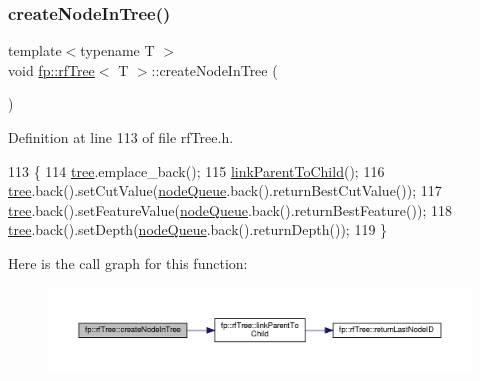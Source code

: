 \subsubsection{\texorpdfstring{create\+Node\+In\+Tree()}{createNodeInTree()}\hspace{0.1cm}{\footnotesize\ttfamily [1/2]}}
{\footnotesize\ttfamily template$<$typename T $>$ \\
void \hyperlink{classfp_1_1rfTree}{fp\+::rf\+Tree}$<$ T $>$\+::create\+Node\+In\+Tree (\begin{DoxyParamCaption}{ }\end{DoxyParamCaption})\hspace{0.3cm}{\ttfamily [inline]}}



Definition at line 113 of file rf\+Tree.\+h.


\begin{DoxyCode}
113                                               \{
114                     \hyperlink{classfp_1_1rfTree_a1d5c209715f4044a85878c17e2b3ee53}{tree}.emplace\_back();
115                     \hyperlink{classfp_1_1rfTree_aceaedc5d54bb429c1a3539f164a93d45}{linkParentToChild}();
116                     \hyperlink{classfp_1_1rfTree_a1d5c209715f4044a85878c17e2b3ee53}{tree}.back().setCutValue(\hyperlink{classfp_1_1rfTree_af72d0a2f930fd480dfb4858885c2df23}{nodeQueue}.back().returnBestCutValue());
117                     \hyperlink{classfp_1_1rfTree_a1d5c209715f4044a85878c17e2b3ee53}{tree}.back().setFeatureValue(\hyperlink{classfp_1_1rfTree_af72d0a2f930fd480dfb4858885c2df23}{nodeQueue}.back().returnBestFeature());
118                     \hyperlink{classfp_1_1rfTree_a1d5c209715f4044a85878c17e2b3ee53}{tree}.back().setDepth(\hyperlink{classfp_1_1rfTree_af72d0a2f930fd480dfb4858885c2df23}{nodeQueue}.back().returnDepth());
119                 \}
\end{DoxyCode}
Here is the call graph for this function\+:
\nopagebreak
\begin{figure}[H]
\begin{center}
\leavevmode
\includegraphics[width=350pt]{classfp_1_1rfTree_aaf9d8cdfbb1d10da53a375ea8204e393_cgraph}
\end{center}
\end{figure}
\mbox{\label{classfp_1_1rfTree_aaf9d8cdfbb1d10da53a375ea8204e393}} 
